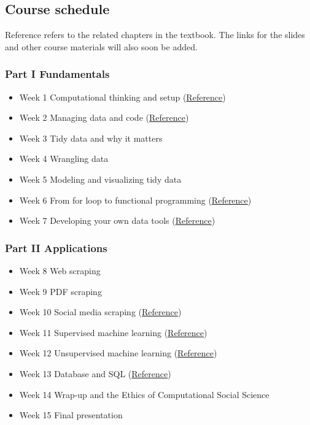 \documentclass[
]{article}
\providecommand{\tightlist}{%
  \setlength{\itemsep}{0pt}\setlength{\parskip}{0pt}}
\begin{document}
\hypertarget{course-schedule}{%
\subsection{Course schedule}\label{course-schedule}}

Reference refers to the related chapters in the textbook. The links for
the slides and other course materials will also soon be added.

\hypertarget{part-i-fundamentals-1}{%
\subsubsection{Part I Fundamentals}\label{part-i-fundamentals-1}}

\begin{itemize}
\tightlist
\item
  Week 1 Computational thinking and setup
  (\href{https://jaeyk.github.io/PS239T/motivation.html}{Reference})
\item
  Week 2 Managing data and code
  (\href{https://jaeyk.github.io/PS239T/git-bash.html}{Reference})
\item
  Week 3 Tidy data and why it matters
\item
  Week 4 Wrangling data
\item
  Week 5 Modeling and visualizing tidy data
\item
  Week 6 From for loop to functional programming
  (\href{https://jaeyk.github.io/PS239T/functional-programming.html}{Reference})
\item
  Week 7 Developing your own data tools
  (\href{https://jaeyk.github.io/PS239T/functional-programming.html\#developing-your-own-data-products}{Reference})
\end{itemize}

\hypertarget{part-ii-applications-1}{%
\subsubsection{Part II Applications}\label{part-ii-applications-1}}

\begin{itemize}
\tightlist
\item
  Week 8 Web scraping
\item
  Week 9 PDF scraping
\item
  Week 10 Social media scraping
  (\href{https://jaeyk.github.io/PS239T/semi-structured-data.html\#xmljson-government-databasesocial-media-scraping}{Reference})
\item
  Week 11 Supervised machine learning
  (\href{https://jaeyk.github.io/PS239T/machine-learning.html\#supervised-learning}{Reference})
\item
  Week 12 Unsupervised machine learning
  (\href{https://jaeyk.github.io/PS239T/machine-learning.html\#unsupervised-learning}{Reference})
\item
  Week 13 Database and SQL
  (\href{https://jaeyk.github.io/PS239T/git-bash.html}{Reference})
\item
  Week 14 Wrap-up and the Ethics of Computational Social Science
\item
  Week 15 Final presentation
\end{itemize}
\end{document}
